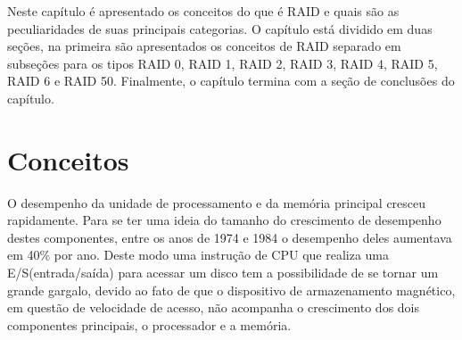 Neste capítulo é apresentado os conceitos do que é RAID e quais são as peculiaridades de suas principais categorias. O capítulo está dividido em duas seções, na primeira são apresentados os conceitos de RAID separado em subseções para os tipos RAID 0, RAID 1, RAID 2, RAID 3, RAID 4, RAID 5, RAID 6 e RAID 50. Finalmente, o capítulo termina com a seção de conclusões do capítulo.

		\section{Conceitos}
		O desempenho da unidade de processamento e da memória principal cresceu rapidamente. Para se ter uma ideia do tamanho do crescimento de desempenho destes componentes, entre os anos de 1974 e 1984 o desempenho deles aumentava em 40\% por ano.
		Deste modo uma instrução de CPU que realiza uma E/S(entrada/saída) para acessar um disco tem a possibilidade de se tornar um grande gargalo, devido ao fato de que o dispositivo de armazenamento magnético, em questão de velocidade de acesso, não acompanha o crescimento dos dois componentes principais, o processador e a memória.\\
		
